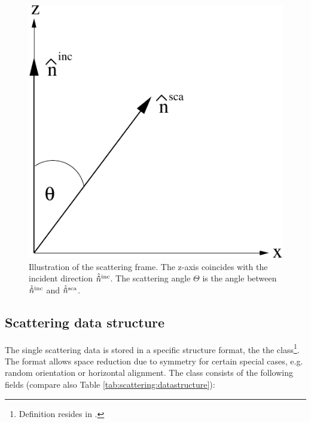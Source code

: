 \begin{figure}[htbp]
 \begin{center}
   \includegraphics*[width=0.4\hsize]{part_frame}
   \caption{Illustration of the scattering frame. The z-axis coincides with the incident direction $\hat{{\bf \hat{n}}}^{\mathrm{inc}}$. The scattering angle $\Theta$ is the angle between  $\hat{{\bf \hat{n}}}^{\mathrm{inc}}$ and $\hat{{\bf \hat{n}}}^{\mathrm{sca}}$.}
   \label{fig:scattering:part_frame}  
 \end{center}
\end{figure}

\subsection{Scattering data structure}
\label{sec:clouds:ARTS_SSP_structure}
 
The single scattering data is stored in a specific structure format, the
the  class\footnote{Definition resides in
.}. The format allows space reduction due to
symmetry for certain special cases, e.g. random orientation or
horizontal alignment. The class consists of the following fields (compare also
Table \ref{tab:scattering:datastructure}):

